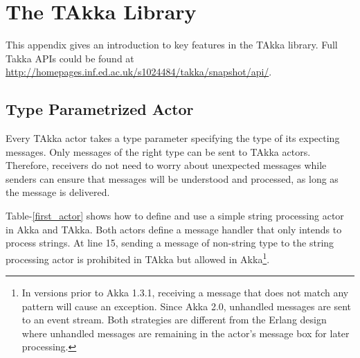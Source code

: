 \section{The TAkka Library}

This appendix gives an introduction to key features in the TAkka library.  Full Takka APIs could be found at \url{http://homepages.inf.ed.ac.uk/s1024484/takka/snapshot/api/}.

\subsection{Type Parametrized Actor}
Every TAkka actor takes a type parameter specifying the type of its expecting messages.  Only messages of the right type can be sent to TAkka actors.  Therefore, receivers do not need to worry about unexpected messages while senders can ensure that messages will be understood and processed, as long as the message is delivered.

Table-\ref{first_actor} shows how to define and use a simple string processing actor in Akka and TAkka.  Both actors define a message handler that only intends to process strings.  At line 15, sending a message of non-string type to the string processing actor is prohibited in TAkka but allowed in Akka\footnote{In versions prior to Akka 1.3.1, receiving a message that does not match any pattern will cause an exception.  Since Akka 2.0, unhandled messages are sent to an event stream.  Both strategies are different from the Erlang design where unhandled messages are remaining in the actor\rq{}s message box for later processing.}.

